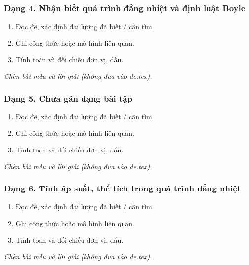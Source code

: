 \subsubsection{Dạng 4. Nhận biết quá trình đẳng nhiệt và định luật Boyle}
\begin{phuongphap}
\begin{enumerate}
\item Đọc đề, xác định đại lượng đã biết / cần tìm.
\item Ghi công thức hoặc mô hình liên quan.
\item Tính toán và đối chiếu đơn vị, dấu.
\end{enumerate}
\end{phuongphap}
\begin{vidumau}
\textit{Chèn bài mẫu và lời giải (không đưa vào de.tex).}
\end{vidumau}

\subsubsection{Dạng 5. Chưa gán dạng bài tập}
\begin{phuongphap}
\begin{enumerate}
\item Đọc đề, xác định đại lượng đã biết / cần tìm.
\item Ghi công thức hoặc mô hình liên quan.
\item Tính toán và đối chiếu đơn vị, dấu.
\end{enumerate}
\end{phuongphap}
\begin{vidumau}
\textit{Chèn bài mẫu và lời giải (không đưa vào de.tex).}
\end{vidumau}

\subsubsection{Dạng 6. Tính áp suất, thể tích trong quá trình đẳng nhiệt}
\begin{phuongphap}
\begin{enumerate}
\item Đọc đề, xác định đại lượng đã biết / cần tìm.
\item Ghi công thức hoặc mô hình liên quan.
\item Tính toán và đối chiếu đơn vị, dấu.
\end{enumerate}
\end{phuongphap}
\begin{vidumau}
\textit{Chèn bài mẫu và lời giải (không đưa vào de.tex).}
\end{vidumau}

